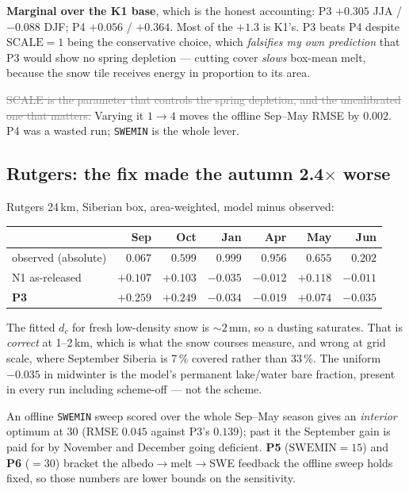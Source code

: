 \documentclass[10pt]{article}
\newcommand{\dead}[1]{\textcolor{gray}{\sout{#1}}}
\begin{document}
\textbf{Marginal over the K1 base}, which is the honest accounting: P3 $+0.305$ JJA /
$-0.088$ DJF; P4 $+0.056$ / $+0.364$. Most of the $+1.3$ is K1's. P3 beats P4 despite
$\mathrm{SCALE}=1$ being the conservative choice, which \emph{falsifies my own prediction}
that P3 would show no spring depletion --- cutting cover \emph{slows} box-mean melt,
because the snow tile receives energy in proportion to its area.

\dead{SCALE is the parameter that controls the spring depletion, and the uncalibrated one
that matters.} Varying it $1\to4$ moves the offline Sep--May RMSE by $0.002$. P4 was a
wasted run; \texttt{SWEMIN} is the whole lever.

\subsection{Rutgers: the fix made the autumn 2.4$\times$ worse}\label{sub:r20rutgers}
Rutgers 24\,km, Siberian box, area-weighted, model minus observed:

\begin{center}\footnotesize
\begin{tabular}{l r r r r r r}
\toprule
 & Sep & Oct & Jan & Apr & May & Jun \\
\midrule
observed (absolute) & $0.067$ & $0.599$ & $0.999$ & $0.956$ & $0.655$ & $0.202$ \\
N1 as-released & $+0.107$ & $+0.103$ & $-0.035$ & $-0.012$ & $+0.118$ & $-0.011$ \\
\textbf{P3} & $\mathbf{+0.259}$ & $\mathbf{+0.249}$ & $-0.034$ & $-0.019$ & $+0.074$ & $-0.035$ \\
\bottomrule
\end{tabular}
\end{center}

\noindent The fitted $d_c$ for fresh low-density snow is ${\sim}2$\,mm, so a dusting
saturates. That is \emph{correct} at 1--2\,km, which is what the snow courses measure, and
wrong at grid scale, where September Siberia is 7\,\% covered rather than 33\,\%. The
uniform $-0.035$ in midwinter is the model's permanent lake/water bare fraction, present in
every run including scheme-off --- not the scheme.

An offline \texttt{SWEMIN} sweep scored over the whole Sep--May season gives an
\emph{interior} optimum at $30$ (RMSE $0.045$ against P3's $0.139$); past it the September
gain is paid for by November and December going deficient. \textbf{P5}
($\mathrm{SWEMIN}=15$) and \textbf{P6} ($=30$) bracket the albedo$\to$melt$\to$SWE feedback
the offline sweep holds fixed, so those numbers are lower bounds on the sensitivity.
\end{document}
